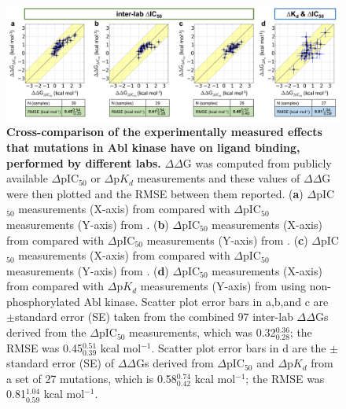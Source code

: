 \documentclass[phd,tocprelim]{cornell}
\begin{document}
\begin{landscape}
	\begin{figure}[p]
		\centering
		\includegraphics[width=0.8\linewidth]{figures/abl-figure-2.pdf}
		\caption[Cross-comparison of the experimentally measured effects that mutations in Abl kinase have on ligand binding, performed by different labs.]{
		{\bf Cross-comparison of the experimentally measured effects that mutations in Abl kinase have on ligand binding, performed by different labs.}
		$\Delta\Delta$G was computed from publicly available $\Delta$pIC$_{50}$ or $\Delta$p$K_{d}$ measurements and these values of $\Delta\Delta$G were then plotted and the RMSE between them reported.
		({\bf a}) $\Delta$pIC$_{50}$ measurements (X-axis) from \protect\cite{Gozgit3992} compared with $\Delta$pIC$_{50}$ measurements (Y-axis) from \protect\cite{Soverini7374}.
		({\bf b}) $\Delta$pIC$_{50}$ measurements (X-axis) from \protect\cite{Gozgit3992} compared with $\Delta$pIC$_{50}$ measurements (Y-axis) from \protect\cite{o2007bcr}.
		({\bf c}) $\Delta$pIC$_{50}$ measurements (X-axis) from \protect\cite{Soverini7374} compared with $\Delta$pIC$_{50}$ measurements (Y-axis) from \protect\cite{o2007bcr}.
		({\bf d}) $\Delta$pIC$_{50}$ measurements (X-axis) from \protect\cite{Gozgit3992} compared with $\Delta$p$K_{d}$ measurements (Y-axis) from \protect\cite{Davis:Nat.Biotechnol.:2011} using non-phosphorylated Abl kinase.
		Scatter plot error bars in a,b,and c are $\pm$standard error (SE) taken from the combined 97 inter-lab $\Delta\Delta$Gs derived from the $\Delta$pIC$_{50}$ measurements, which was 0.32$_{0.28}^{0.36}$;
		the RMSE was 0.45$_{0.39}^{0.51}$ kcal mol$^{-1}$. Scatter plot error bars in d are the $\pm$standard error (SE) of $\Delta\Delta$Gs derived from $\Delta$pIC$_{50}$ and $\Delta$p$K_{d}$ from a set of 27 mutations, which is 0.58$_{0.42}^{0.74}$ kcal mol$^{-1}$;
		the RMSE was 0.81$_{0.59}^{1.04}$ kcal mol$^{-1}$.
	}
		\label{fig:abl-figure2}
	\end{figure}
\end{landscape}
\end{document}
